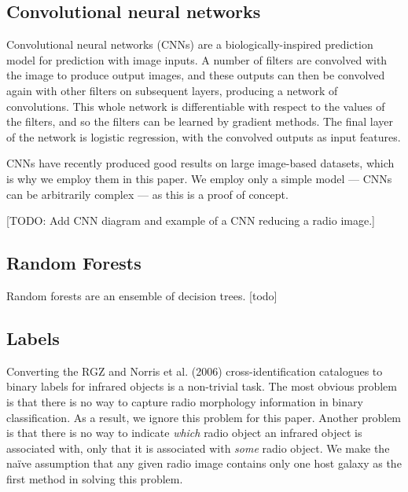 \documentclass[fleqn,usenatbib,usedcolumn]{mnras}
\begin{document}
  \subsection{Convolutional neural
  networks}\label{convolutional-neural-networks}

    Convolutional neural networks (CNNs) are a biologically-inspired
    prediction model for prediction with image inputs. A number of filters
    are convolved with the image to produce output images, and these outputs
    can then be convolved again with other filters on subsequent layers,
    producing a network of convolutions. This whole network is
    differentiable with respect to the values of the filters, and so the
    filters can be learned by gradient methods. The final layer of the
    network is logistic regression, with the convolved outputs as input
    features.

    CNNs have recently produced good results on large image-based datasets,
    which is why we employ them in this paper. We employ only a simple model
    --- CNNs can be arbitrarily complex --- as this is a proof of concept.

    {[}TODO: Add CNN diagram and example of a CNN reducing a radio image.{]}

  \subsection{Random Forests}\label{random-forests}

    Random forests are an ensemble of decision trees. {[}todo{]}

  \subsection{Labels}\label{labels}

    Converting the RGZ and Norris et al. (2006) cross-identification
    catalogues to binary labels for infrared objects is a non-trivial task.
    The most obvious problem is that there is no way to capture radio
    morphology information in binary classification. As a result, we ignore
    this problem for this paper. Another problem is that there is no way to
    indicate \emph{which} radio object an infrared object is associated
    with, only that it is associated with \emph{some} radio object. We make
    the naïve assumption that any given radio image contains only one host
    galaxy as the first method in solving this problem.
\end{document}
